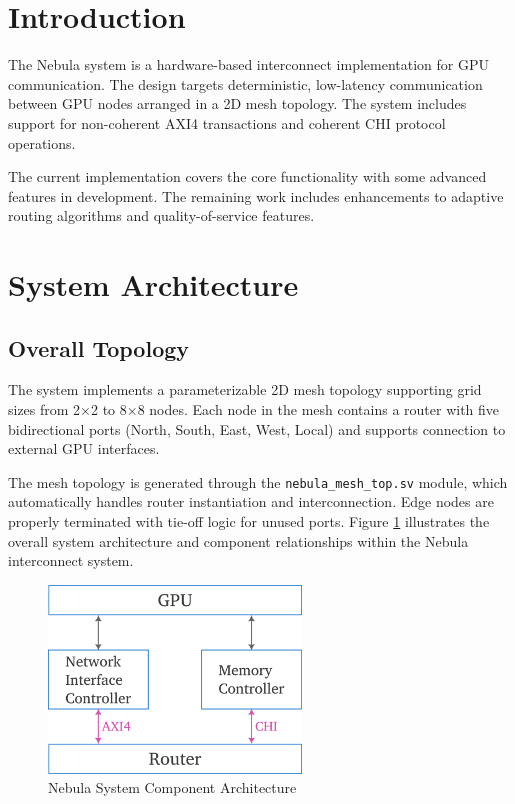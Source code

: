 \documentclass[12pt,letterpaper]{article}
\begin{document}
\section{Introduction}

The Nebula system is a hardware-based interconnect implementation for GPU communication. The design targets deterministic, low-latency communication between GPU nodes arranged in a 2D mesh topology. The system includes support for non-coherent AXI4 transactions and coherent CHI protocol operations.

The current implementation covers the core functionality with some advanced features in development. The remaining work includes enhancements to adaptive routing algorithms and quality-of-service features.

\section{System Architecture}

\subsection{Overall Topology}

The system implements a parameterizable 2D mesh topology supporting grid sizes from 2×2 to 8×8 nodes. Each node in the mesh contains a router with five bidirectional ports (North, South, East, West, Local) and supports connection to external GPU interfaces.

The mesh topology is generated through the \texttt{nebula\_mesh\_top.sv} module, which automatically handles router instantiation and interconnection. Edge nodes are properly terminated with tie-off logic for unused ports. Figure \ref{fig:component-architecture} illustrates the overall system architecture and component relationships within the Nebula interconnect system.

\begin{figure}[H]
    \centering
    \includegraphics[width=0.6\textwidth]{images/component-architecture.png}
    \caption{Nebula System Component Architecture}
    \label{fig:component-architecture}
\end{figure}
\end{document}

